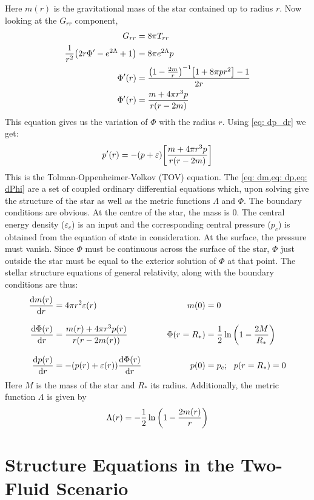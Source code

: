 \documentclass[a4paper,12pt,onehalfspacing]{report}
\begin{document}
Here $m(r)$ is the gravitational mass of the star contained up to radius $r$. 
Now looking at the $G_{rr}$ component, 
\begin{align}
    {G}_{rr} &= 8\pi T_{rr}\nonumber\\
    \frac{1}{r^2}\qty(2 r \Phi '-{e^{2 \Lambda}+1})&= 8\pi e^{2\Lambda}p\nonumber\\
    \Phi '(r)&=\frac{\qty(1-\frac{2m}{r})^{-1}\qty[1+8 \pi p r^2]-1}{2 r}\nonumber\\
    \Phi'(r) &=\frac{m+4 \pi r^3p}{r (r- 2 m)}\label{eq: dPhi}
\end{align}
This equation gives us the variation of $\Phi$ with the radius $r$. Using \cref{eq: dp_dr} we get:
\begin{align}
    p'(r) =-(p+\varepsilon)\qty[\frac{m+4 \pi r^3p}{r (r- 2 m)}]\label{eq: dp}
\end{align}
This is the Tolman-Oppenheimer-Volkov (TOV) equation. The \cref{eq: dm,eq: dp,eq: dPhi} are a set of coupled ordinary differential equations which, upon solving give the structure of the star as well as the metric functions $\Lambda$ and $\Phi$. The boundary conditions are obvious. At the centre of the star, the mass is $0$. The central energy density ($\varepsilon_c$) is an input and the corresponding central pressure ($p_c$) is obtained from the equation of state in consideration. At the surface, the pressure must vanish. Since $\Phi$ must be continuous across the surface of the star, $\Phi$ just outside the star must be equal to the exterior solution of $\Phi$ at that point. The stellar structure equations of general relativity, along with the boundary conditions are thus:
\begin{equation}
    \begin{aligned}
        \dv{m(r)}{r}&= 4\pi r^2 \varepsilon(r) \qquad& m(0) &= 0 \\[2ex]
        \dv{\Phi(r)}{r} &= \frac{m(r)+4 \pi r^3p(r)}{r (r- 2 m(r))} \qquad& \Phi(r=R_*)&= \frac{1}{2}\ln\qty(1-\frac{2M}{R_*})\\[2ex]
        \dv{p(r)}{r}&= -(p(r)+\varepsilon(r))\dv{\Phi(r)}{r} \qquad& p(0)&=p_c;\ \ p(r=R_*)= 0
    \end{aligned}\label{eq: structure eqns}
\end{equation}
Here $M$ is the mass of the star and $R_*$ its radius. Additionally, the metric function $\Lambda$ is given by $$\Lambda(r) = -\frac{1}{2}\ln\qty(1-\frac{2m(r)}{r})$$

\section{Structure Equations in the Two-Fluid Scenario}
\end{document}
